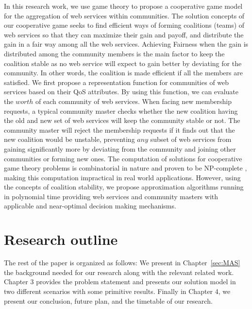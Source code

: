 In this research work, we use game theory to
propose a cooperative game model for the aggregation of web
services within communities. The solution concepts of our
cooperative game seeks to find efficient ways of forming
coalitions (teams) of web services so that they can maximize their
gain and payoff, and distribute the gain in a fair way among all
the web services. Achieving Fairness when the gain is distributed
among the community members is the main factor to keep the
coalition stable as no web service will expect to gain better by
deviating for the community. In other words, the coalition is made
efficient if all the members are satisfied. We first propose a
representation function for communities of web services based on
their QoS attributes. By using this function, we can evaluate the
$worth$ of each community of web services. When facing new
membership requests, a typical community master checks whether the
new coalition having the old and new set of web services will keep
the community stable or not. The community master will reject the
membership requests if it finds out that the new coalition would
be unstable, preventing $any$ subset of web services from gaining
significantly more by deviating from the community and joining
other communities or forming new ones. The computation of
solutions for cooperative game theory problems is combinatorial in
nature and proven to be NP-complete \cite{Algorithmic}, making
this computation impractical in real world applications. However,
using the concepts of coalition stability, we propose
approximation algorithms running in polynomial time providing web
services and community masters with applicable and near-optimal
decision making mechanisms.


\section{Research outline}\label{sec:outline}
The rest of the paper is organized as follows: We present in Chapter~\ref{sec:MAS} the background 
needed for our research along with the relevant related work. Chapter 3 provides the problem statement and presents our solution model in two 
different scenarios with some primitive results. Finally in Chapter 4, we present our conclusion, future plan, and the timetable of our research.

